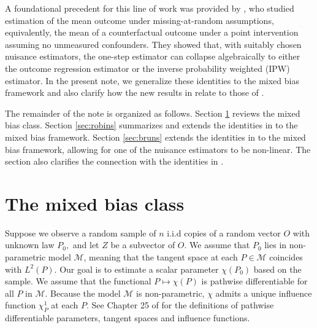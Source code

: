 \documentclass{article}
\begin{document}
A foundational precedent for this line of work was provided by \cite{robins2007comment}, who studied estimation of the mean outcome under missing-at-random
assumptions, equivalently, the mean of a counterfactual outcome under a point intervention assuming no unmeasured confounders. They showed that, with suitably chosen nuisance estimators, the
one-step estimator can collapse algebraically to either the outcome
regression estimator or the inverse probability weighted (IPW) estimator. In
the present note, we generalize these identities to the mixed bias framework
and also clarify how the new results in \cite{bruns2025augmented} relate to
those of \cite{robins2007comment}.

The remainder of the note is organized as follows. Section \ref{sec:mixed} reviews the
mixed bias class. Section \ref{sec:robins} summarizes and extends the identities in
\cite{robins2007comment} to the mixed bias framework. Section \ref{sec:bruns} extends the
identities in \cite{bruns2025augmented} to the mixed bias framework,
allowing for one of the nuisance estimators to be non-linear. The section
also clarifies the connection with the identities in \cite{robins2007comment}.

\section{The mixed bias class}\label{sec:mixed}

Suppose we observe a random sample of $n$ i.i.d copies of a random vector $O$
with unknown law $P_{0},$ and let $Z$ be a subvector of $O$. We assume that $%
P_{0}$ lies in non-parametric model $\mathcal{M}$, meaning that the tangent
space at each $P\in \mathcal{M}$ coincides with $L^{2}(P).$ Our goal is to
estimate a scalar parameter $\chi \left( P_{0}\right) $ based on the sample.
We assume that the functional $P\mapsto \chi \left( P\right) $ is pathwise
differentiable for all $P$ in $\mathcal{M}$. Because the model $\mathcal{M}$
is non-parametric, $\chi $ admits a unique influence function $\chi _{P}^{1}$
at each $P.$  See Chapter 25 of \cite{van2000} for the definitions of
pathwise differentiable parameters, tangent spaces and influence functions.
\end{document}
